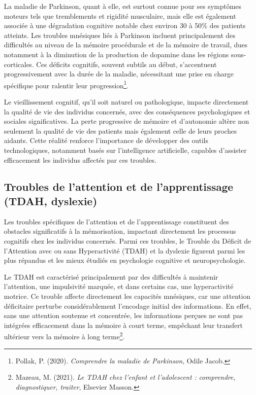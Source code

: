 \documentclass[12pt,a4paper]{report}
\begin{document}
La maladie de Parkinson, quant à elle, est surtout connue pour ses symptômes moteurs tels que tremblements et rigidité musculaire, mais elle est également associée à une dégradation cognitive notable chez environ 30 à 50\% des patients atteints. Les troubles mnésiques liés à Parkinson incluent principalement des difficultés au niveau de la mémoire procédurale et de la mémoire de travail, dues notamment à la diminution de la production de dopamine dans les régions sous-corticales. Ces déficits cognitifs, souvent subtils au début, s’accentuent progressivement avec la durée de la maladie, nécessitant une prise en charge spécifique pour ralentir leur progression\footnote{Pollak, P. (2020). \textit{Comprendre la maladie de Parkinson}, Odile Jacob.}.

Le vieillissement cognitif, qu’il soit naturel ou pathologique, impacte directement la qualité de vie des individus concernés, avec des conséquences psychologiques et sociales significatives. La perte progressive de mémoire et d’autonomie altère non seulement la qualité de vie des patients mais également celle de leurs proches aidants. Cette réalité renforce l’importance de développer des outils technologiques, notamment basés sur l’intelligence artificielle, capables d’assister efficacement les individus affectés par ces troubles.

\subsection{Troubles de l’attention et de l’apprentissage (TDAH, dyslexie)}

Les troubles spécifiques de l’attention et de l’apprentissage constituent des obstacles significatifs à la mémorisation, impactant directement les processus cognitifs chez les individus concernés. Parmi ces troubles, le Trouble du Déficit de l'Attention avec ou sans Hyperactivité (TDAH) et la dyslexie figurent parmi les plus répandus et les mieux étudiés en psychologie cognitive et neuropsychologie.

Le TDAH est caractérisé principalement par des difficultés à maintenir l’attention, une impulsivité marquée, et dans certains cas, une hyperactivité motrice. Ce trouble affecte directement les capacités mnésiques, car une attention déficitaire perturbe considérablement l'encodage initial des informations. En effet, sans une attention soutenue et concentrée, les informations perçues ne sont pas intégrées efficacement dans la mémoire à court terme, empêchant leur transfert ultérieur vers la mémoire à long terme\footnote{Mazeau, M. (2021). \textit{Le TDAH chez l'enfant et l'adolescent : comprendre, diagnostiquer, traiter}, Elsevier Masson.}.
\end{document}
